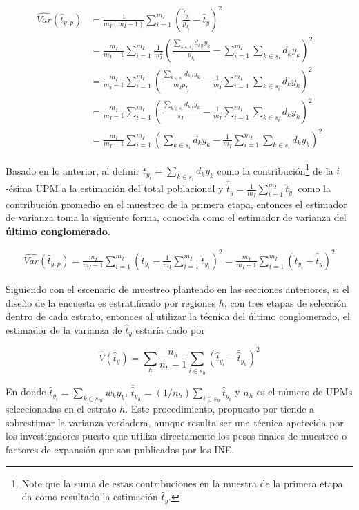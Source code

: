\begin{align*}
\widehat{Var}(\hat{t}_{y,p})&=\frac{1}{m_I(m_I-1)}\sum_{i=1}^{m_I}\left(\frac{\hat{t}_{y_i}}{p_{I_i}}-\hat{t}_{y}\right)^2\\
&=\frac{m_I}{m_I-1}\sum_{i=1}^{m_I}\frac{1}{m_I^2}\left(\frac{\sum_{k \in s_i} d_{k|i} y_k }{p_{I_i}}-\sum_{i=1}^{m_I}\sum_{k \in s_i} d_k y_k \right)^2 \\
&=\frac{m_I}{m_I-1}\sum_{i=1}^{m_I}\left(\frac{\sum_{k \in s_i} d_{k|i} y_k }{m_I p_{I_i}}-\frac{1}{m_I}\sum_{i=1}^{m_I}\sum_{k \in s_i} d_k y_k \right)^2 \\
&=\frac{m_I}{m_I-1}\sum_{i=1}^{m_I}\left(\frac{\sum_{k \in s_i} d_{k|i} y_k }{\pi_{I_i}}-\frac{1}{m_I}\sum_{i=1}^{m_I}\sum_{k \in s_i} d_k y_k \right)^2 \\
&=\frac{m_I}{m_I-1}\sum_{i=1}^{m_I}\left( \sum_{k \in s_i} d_k y_k -\frac{1}{m_I}\sum_{i=1}^{m_I}\sum_{k \in s_i} d_k y_k \right)^2 
\end{align*}

Basado en lo anterior, al definir \(\breve{t}_{y_i} = \sum_{k \in s_i} d_k y_k\) como la contribución\footnote{Note que la suma de estas contribuciones en la muestra de la primera etapa da como resultado la estimación \(\hat{t}_y\).} de la \(i\)-ésima UPM a la estimación del total poblacional y \(\bar{\breve{t}}_{y}=\frac{1}{m_I}\sum_{i=1}^{m_I}\breve{t}_{y_i}\) como la contribución promedio en el muestreo de la primera etapa, entonces el estimador de varianza toma la siguiente forma, conocida como el estimador de varianza del \textbf{último conglomerado}.

\begin{align}
\label{UC}
\widehat{Var}(\hat{t}_{y,p})
=\frac{m_I}{m_I-1}\sum_{i=1}^{m_I}\left( \breve{t}_{y_i} -\frac{1}{m_I}\sum_{i=1}^{m_I}\breve{t}_{y_i} \right)^2 
=\frac{m_I}{m_I-1}\sum_{i=1}^{m_I}\left( \breve{t}_{y_i} - \bar{\breve{t}}_{y} \right)^2
\end{align}

Siguiendo con el escenario de muestreo planteado en las secciones anteriores, si el diseño de la encuesta es estratificado por regiones \(h\), con tres etapas de selección dentro de cada estrato, entonces al utilizar la técnica del último conglomerado, el estimador de la varianza de \(\hat{t}_{y}\) estaría dado por

\[
\hat{V}(\hat{t}_{y}) = 
\sum_h\frac{n_h}{n_h-1}\sum_{i\in s_h}\left(\hat{t}_{y_i}-\bar{\hat{t}}_{y_h}\right)^2
\]

En donde \(\hat{t}_{y_i} = \sum_{k \in s_{hi}} w_k y_k\), \(\bar{\hat{t}}_{y_h}=(1/n_h)\sum_{i \in s_h}\hat{t}_{y_i}\) y \(n_h\) es el número de UPMs seleccionadas en el estrato \(h\). Este procedimiento, propuesto por \citet{hansen1953sample} tiende a sobrestimar la varianza verdadera, aunque resulta ser una técnica apetecida por los investigadores puesto que utiliza directamente los pesos finales de muestreo o factores de expansión que son publicados por los INE.

